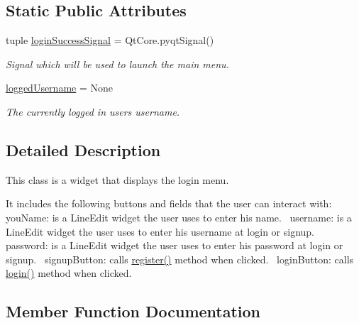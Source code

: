 \subsection*{Static Public Attributes}
\begin{DoxyCompactItemize}
\item 
tuple \hyperlink{classsrc_1_1login__menu_1_1_login_menu_a0c7d684b7c11fd92f8de9beee9cf2a9f}{login\+Success\+Signal} = Qt\+Core.\+pyqt\+Signal()
\begin{DoxyCompactList}\small\item\em Signal which will be used to launch the main menu. \end{DoxyCompactList}\item 
\hyperlink{classsrc_1_1login__menu_1_1_login_menu_a3c59b83a7a55f2334a015dfc722e86da}{logged\+Username} = None
\begin{DoxyCompactList}\small\item\em The currently logged in user\textquotesingle{}s username. \end{DoxyCompactList}\end{DoxyCompactItemize}


\subsection{Detailed Description}
This class is a widget that displays the login menu. 

It includes the following buttons and fields that the user can interact with\+:~\newline
 you\+Name\+: is a Line\+Edit widget the user uses to enter his name.~\newline
 username\+: is a Line\+Edit widget the user uses to enter his username at login or signup.~\newline
 password\+: is a Line\+Edit widget the user uses to enter his password at login or signup.~\newline
 signup\+Button\+: calls \hyperlink{classsrc_1_1login__menu_1_1_login_menu_af6ee6a8dee90f1a94a506400356707ad}{register()} method when clicked.~\newline
 login\+Button\+: calls \hyperlink{classsrc_1_1login__menu_1_1_login_menu_a75303935e17e43388fd4ef3df029944e}{login()} method when clicked.~\newline
 

\subsection{Member Function Documentation}
\hypertarget{classsrc_1_1login__menu_1_1_login_menu_a5114077865bfc30e8adef2f90cd27d85}{}
